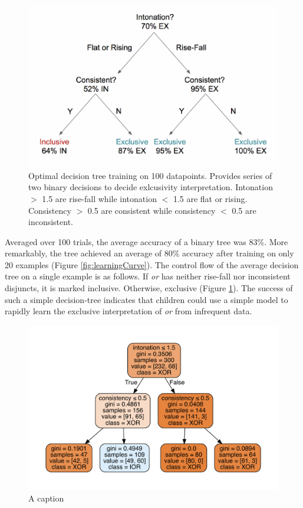 \documentclass[oneside]{report}
\theoremstyle{definition}
\theoremstyle{definition}
\theoremstyle{definition}
\theoremstyle{remark}
\begin{document}
\begin{figure}[tb]

{\centering \includegraphics{figs/treeDiagram-1} 

}

\caption{Optimal decision tree training on 100 datapoints. Provides series of two binary decisions to decide exlcusivity interpretation. Intonation $>$ 1.5 are rise-fall while intonation $<$ 1.5 are flat or rising. Consistency $>$ 0.5 are consistent while consistency $<$ 0.5 are  inconsistent.}\label{fig:treeDiagram}
\end{figure}
Averaged over 100 trials, the average accuracy of a binary tree was
83\%. More remarkably, the tree achieved an average of 80\% accuracy
after training on only 20 examples (Figure \ref{fig:learningCurve}). The
control flow of the average decision tree on a single example is as
follows. If \emph{or} has neither rise-fall nor inconsistent disjuncts,
it is marked inclusive. Otherwise, exclusive (Figure
\ref{fig:treeDiagram}). The success of such a simple decision-tree
indicates that children could use a simple model to rapidly learn the
exclusive interpretation of \emph{or} from infrequent data.
\begin{figure}[tb]
\includegraphics[width=0.6\linewidth]{decision_trees/plots/exin} \caption{A caption}\label{fig:exorTree}
\end{figure}
\end{document}

